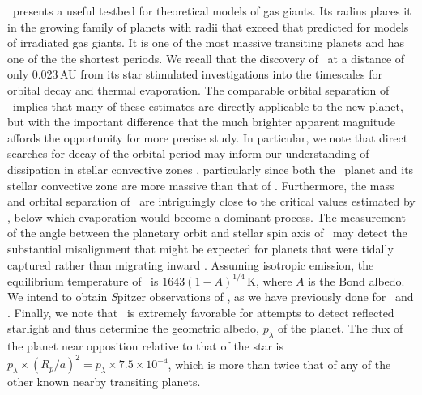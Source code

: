 \tresThree\ presents a useful testbed for theoretical models of gas giants.
Its radius places it in the growing family of planets with radii that exceed that predicted for models of irradiated gas giants.
It is one of the most massive transiting planets and has one of the the shortest periods.
We recall that the discovery of \ogletrFSb\ at a distance of only 0.023\,AU from its star stimulated investigations into the timescales for orbital decay and thermal evaporation.
The comparable orbital separation of \tresThree\ implies that many of these estimates are directly applicable to the new planet, but with the important difference that the much brighter apparent magnitude affords the opportunity for more precise study.
In particular, we note that direct searches for decay of the orbital period may inform our understanding of dissipation in stellar convective zones \citep{Sasselov:apj:2003a}, particularly since both the \tresThree\ planet and its stellar convective zone are more massive than that of \ogletrFSb.
Furthermore, the mass and orbital separation of \tresThree\ are intriguingly close to the critical values estimated by \citet{Baraffe_Selsis_Chabrier:aa:2004a}, below which evaporation would become a dominant process.
The measurement of the angle between the planetary orbit and stellar spin axis of \tresThree\ may detect the substantial misalignment that might be expected for planets that were tidally captured rather than migrating inward \citep{Gaudi_Winn:apj:2007a}.
Assuming isotropic emission, the equilibrium temperature of \tresThree\ is $1643(1-A)^{1/4}$\,K, where $A$ is the Bond albedo.%
We intend to obtain {\textit Spitzer} observations of \tresThree, as we have previously done for \tresOne\ and \tresTwo.
Finally, we note that \tresThree\ is extremely favorable for attempts to detect reflected starlight \citep{Charbonneau_Noyes_Korzennik:apjl:1999a, Leigh_Collier-Cameron_Udry:mnras:2003a, Rowe_Matthews_Seager:apj:2006a} and thus determine the geometric albedo, $p_{\lambda}$ of the planet.
The flux of the planet near opposition relative to that of the star is $p_{\lambda} \times (R_p / a)^2 = p_{\lambda} \times 7.5 \times 10^{-4}$, which is more than twice that of any of the other known nearby transiting planets.%

